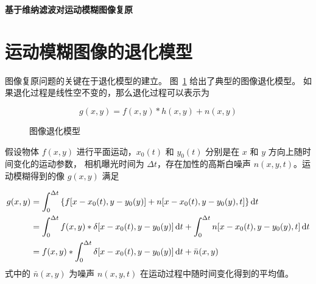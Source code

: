 \documentclass{hitgsrep}
\newcommand{\subjectname}[1]{\begin{center}\LARGE\bfseries #1\end{center}}
\begin{document}
\maketitle

\subjectname{基于维纳滤波对运动模糊图像复原}

\section{运动模糊图像的退化模型}

图像复原问题的关键在于退化模型的建立。
图~\ref{fig:model} 给出了典型的图像退化模型。
如果退化过程是线性空不变的，那么退化过程可以表示为

\begin{equation}\label{eq:model}
    g(x,y)=f(x,y)*h(x,y)+n(x,y)
\end{equation}

\begin{figure}[htb!]
    \centering
    \caption{图像退化模型}
    \label{fig:model}
\end{figure}

假设物体 $f(x,y)$ 进行平面运动，$x_0(t)$  和 $y_0(t)$ 分别是在 $x$ 和 $y$ 方向上随时间变化的运动参数，
相机曝光时间为 $\Delta t$，存在加性的高斯白噪声 $n(x,y,t)$。运动模糊得到的像 $g(x,y)$ 满足

\begin{equation}\label{eq:motion}
    \begin{aligned}
        g(x,y)&=\int_0^{\Delta t}\qty{f[x-x_0(t),y-y_0(y)]+n[x-x_0(t),y-y_0(y),t]}\dd{t}\\
        &=\int_0^{\Delta t}f(x,y)*\delta[x-x_0(t),y-y_0(y)]\dd{t}+\int_0^{\Delta t}n[x-x_0(t),y-y_0(y),t]\dd{t}\\
        &=f(x,y)*\int_0^{\Delta t}\delta[x-x_0(t),y-y_0(y)]\dd{t}+\bar{n}(x,y)
    \end{aligned}
\end{equation}
式中的 $\bar{n}(x,y)$ 为噪声 $n(x,y,t)$ 在运动过程中随时间变化得到的平均值。
\end{document}
